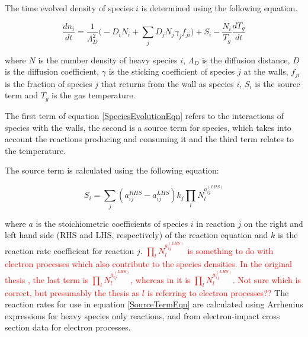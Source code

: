 \documentclass[11pt, oneside]{article}   	%
\begin{document}
The time evolved density of species $i$ is determined using the following equation.

\begin{equation}
\frac{dn_i}{dt} = \frac{1}{\Lambda_D^2}\bigg(-D_iN_i + \sum_jD_jN_j\gamma_jf_{ji}\bigg) + S_i - \frac{N_i}{T_g}\frac{dT_g}{dt}
\label{SpeciesEvolutionEqn}
\end{equation}

where $N$ is the number density of heavy species $i$, $\Lambda_D$ is the diffusion distance, $D$ is the diffusion coefficient, $\gamma$ is the sticking coefficient of species $j$ at the walls, $f_{ji}$ is the fraction of species $j$ that returns from the wall as species $i$, $S_i$ is the source term and $T_g$ is the gas temperature.

The first term of equation \ref{SpeciesEvolutionEqn} refers to the interactions of species with the walls, the second is a source term for species, which takes into account the reactions producing and consuming it and the third term relates to the temperature.

The source term is calculated using the following equation:

\begin{equation}
S_i = \sum_j(a_{ij}^{RHS}-a_{ij}^{LHS})k_j\prod_lN_l^{a_{ij}^{(LHS)}}
\label{SourceTermEqn}
\end{equation}

where $a$ is the stoichiometric coefficients of species $i$ in reaction $j$ on the right and left hand side (RHS and LHS, respectively) of the reaction equation and $k$ is the reaction rate coefficient for reaction $j$.
\textcolor{red}{ $\prod_lN_l^{a_{ij}^{(LHS)}}$ is something to do with electron processes which also contribute to the species densities. 
In the original thesis \cite{Dorai2002modeling}, the last term is $\prod_lN_l^{a_{lj}^{(LHS)}}$, whereas in \cite{Stafford2004O2} it is $\prod_lN_l^{a_{ij}^{(LHS)}}$. 
Not sure which is correct, but presumably the thesis as $l$ is referring to electron processes??}
The reaction rates for use in equation \ref{SourceTermEqn} are calculated using Arrhenius expressions for heavy species only reactions, and from electron-impact cross section data for electron processes. 
\end{document}
